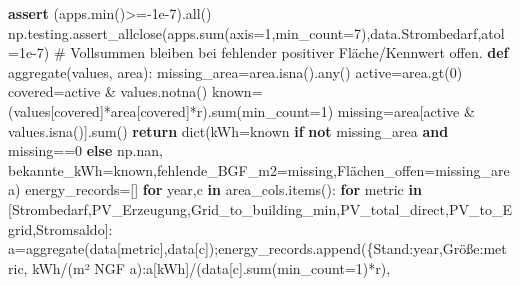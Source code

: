\documentclass[
  ngerman,
  a4paper,
  DIV=11]{scrreprt}
\newenvironment{Shaded}{\begin{snugshade}}{\end{snugshade}}
\newcommand{\BuiltInTok}[1]{\textcolor[rgb]{0.00,0.23,0.31}{#1}}
\newcommand{\CommentTok}[1]{\textcolor[rgb]{0.37,0.37,0.37}{#1}}
\newcommand{\ControlFlowTok}[1]{\textcolor[rgb]{0.00,0.23,0.31}{\textbf{#1}}}
\newcommand{\DecValTok}[1]{\textcolor[rgb]{0.68,0.00,0.00}{#1}}
\newcommand{\FloatTok}[1]{\textcolor[rgb]{0.68,0.00,0.00}{#1}}
\newcommand{\KeywordTok}[1]{\textcolor[rgb]{0.00,0.23,0.31}{\textbf{#1}}}
\newcommand{\NormalTok}[1]{\textcolor[rgb]{0.00,0.23,0.31}{#1}}
\newcommand{\OperatorTok}[1]{\textcolor[rgb]{0.37,0.37,0.37}{#1}}
\newcommand{\StringTok}[1]{\textcolor[rgb]{0.13,0.47,0.30}{#1}}
\begin{document}
\begin{Shaded}
\begin{Highlighting}[]
\ControlFlowTok{assert}\NormalTok{ (apps.}\BuiltInTok{min}\NormalTok{()}\OperatorTok{\textgreater{}={-}}\FloatTok{1e{-}7}\NormalTok{).}\BuiltInTok{all}\NormalTok{()}
\NormalTok{np.testing.assert\_allclose(apps.}\BuiltInTok{sum}\NormalTok{(axis}\OperatorTok{=}\DecValTok{1}\NormalTok{,min\_count}\OperatorTok{=}\DecValTok{7}\NormalTok{),data.Strombedarf,atol}\OperatorTok{=}\FloatTok{1e{-}7}\NormalTok{)}
\CommentTok{\# Vollsummen bleiben bei fehlender positiver Fläche/Kennwert offen.}
\KeywordTok{def}\NormalTok{ aggregate(values, area):}
\NormalTok{    missing\_area}\OperatorTok{=}\NormalTok{area.isna().}\BuiltInTok{any}\NormalTok{()}
\NormalTok{    active}\OperatorTok{=}\NormalTok{area.gt(}\DecValTok{0}\NormalTok{)}
\NormalTok{    covered}\OperatorTok{=}\NormalTok{active }\OperatorTok{\&}\NormalTok{ values.notna()}
\NormalTok{    known}\OperatorTok{=}\NormalTok{(values[covered]}\OperatorTok{*}\NormalTok{area[covered]}\OperatorTok{*}\NormalTok{r).}\BuiltInTok{sum}\NormalTok{(min\_count}\OperatorTok{=}\DecValTok{1}\NormalTok{)}
\NormalTok{    missing}\OperatorTok{=}\NormalTok{area[active }\OperatorTok{\&}\NormalTok{ values.isna()].}\BuiltInTok{sum}\NormalTok{()}
    \ControlFlowTok{return} \BuiltInTok{dict}\NormalTok{(kWh}\OperatorTok{=}\NormalTok{known }\ControlFlowTok{if} \KeywordTok{not}\NormalTok{ missing\_area }\KeywordTok{and}\NormalTok{ missing}\OperatorTok{==}\DecValTok{0} \ControlFlowTok{else}\NormalTok{ np.nan,}
\NormalTok{                bekannte\_kWh}\OperatorTok{=}\NormalTok{known,fehlende\_BGF\_m2}\OperatorTok{=}\NormalTok{missing,Flächen\_offen}\OperatorTok{=}\NormalTok{missing\_area)}
\NormalTok{energy\_records}\OperatorTok{=}\NormalTok{[]}
\ControlFlowTok{for}\NormalTok{ year,c }\KeywordTok{in}\NormalTok{ area\_cols.items():}
    \ControlFlowTok{for}\NormalTok{ metric }\KeywordTok{in}\NormalTok{ [}\StringTok{\textquotesingle{}Strombedarf\textquotesingle{}}\NormalTok{,}\StringTok{\textquotesingle{}PV\_Erzeugung\textquotesingle{}}\NormalTok{,}\StringTok{\textquotesingle{}Grid\_to\_building\_min\textquotesingle{}}\NormalTok{,}\StringTok{\textquotesingle{}PV\_total\_direct\textquotesingle{}}\NormalTok{,}\StringTok{\textquotesingle{}PV\_to\_Egrid\textquotesingle{}}\NormalTok{,}\StringTok{\textquotesingle{}Stromsaldo\textquotesingle{}}\NormalTok{]:}
\NormalTok{        a}\OperatorTok{=}\NormalTok{aggregate(data[metric],data[c])}\OperatorTok{;}\NormalTok{energy\_records.append(\{}\StringTok{\textquotesingle{}Stand\textquotesingle{}}\NormalTok{:year,}\StringTok{\textquotesingle{}Größe\textquotesingle{}}\NormalTok{:metric,}
            \StringTok{\textquotesingle{}kWh/(m² NGF a)\textquotesingle{}}\NormalTok{:a[}\StringTok{\textquotesingle{}kWh\textquotesingle{}}\NormalTok{]}\OperatorTok{/}\NormalTok{(data[c].}\BuiltInTok{sum}\NormalTok{(min\_count}\OperatorTok{=}\DecValTok{1}\NormalTok{)}\OperatorTok{*}\NormalTok{r),}

\end{Highlighting}
\end{Shaded}
\end{document}
